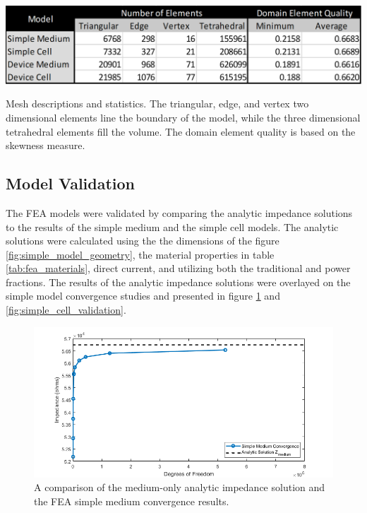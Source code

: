 \begin{table}[H]
    \centering
    \includegraphics[width=\textwidth]{images/meshStats.png}
    \caption[Mesh descriptions and statistics]{Mesh descriptions and statistics. The triangular, edge, and vertex two dimensional elements line the boundary of the model, while the three dimensional tetrahedral elements fill the volume. The domain element quality is based on the skewness measure.}
    \label{tab: meshStats}
\end{table}


\subsection{Model Validation}
\par The FEA models were validated by comparing the analytic impedance solutions to the results of the simple medium and the simple cell models. The analytic solutions were calculated using the the dimensions of the figure \ref{fig:simple_model_geometry}, the material properties in table \ref{tab:fea_materials}, direct current, and utilizing both the traditional and power fractions. The results of the analytic impedance solutions were overlayed on the simple model convergence studies and presented in figure \ref{fig:simple_medium_validation} and \ref{fig:simple_cell_validation}.

\begin{figure}[h]
    \centering
    \includegraphics[width=\textwidth]{images/simpeMediumValidation.png}
    \caption[Simple medium validation]{A comparison of the medium-only analytic impedance solution and the FEA simple medium convergence results.}
    \label{fig:simple_medium_validation}
\end{figure}

